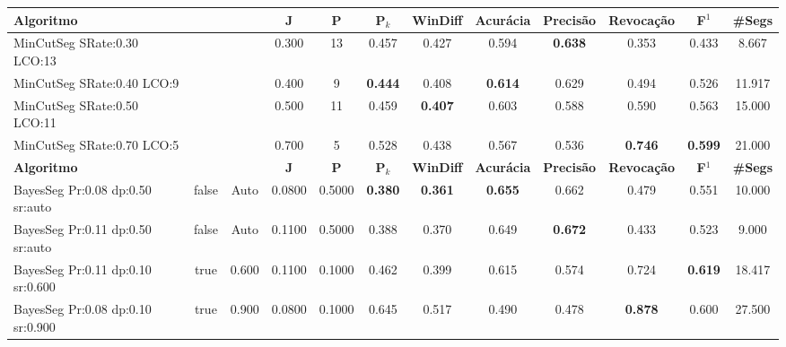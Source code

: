 \documentclass{article}
\begin{document}
\begin{table}[!h]
\begin{tabular}{|l||c|c|c|c|c|c|c|c|c|c|c|}
\hline
		\textbf{Algoritmo} &&& 
		\textbf{J} &
		\textbf{P} & 
		\textbf{P$_k$} & 
		\textbf{WinDiff} & 
		\textbf{Acurácia} & 
		\textbf{Precisão} & 
		\textbf{Revocação} &
		\textbf{F$^1$} &
		\textbf{\#Segs} \\	\hline


 MinCutSeg SRate:0.30 LCO:13 &&& 0.300 & 13 & 0.457 & 0.427 & 0.594 & \cellcolor{gray!20} \textbf{0.638} & 0.353 & 0.433 & 8.667  \\ \hline 

 MinCutSeg SRate:0.40 LCO:9 &&& 0.400 & 9 & \cellcolor{gray!20} \textbf{0.444} & 0.408 & \cellcolor{gray!20} \textbf{0.614} & 0.629 & 0.494 & 0.526 & 11.917  \\ \hline 

 MinCutSeg SRate:0.50 LCO:11 &&& 0.500 & 11 & 0.459 & \cellcolor{gray!20} \textbf{0.407} & 0.603 & 0.588 & 0.590 & 0.563 & 15.000  \\ \hline 

 MinCutSeg SRate:0.70 LCO:5 &&& 0.700 & 5 & 0.528 & 0.438 & 0.567 & 0.536 & \cellcolor{gray!20} \textbf{0.746} & \cellcolor{gray!20} \textbf{0.599} & 21.000  \\ \hline 






\hline
		\textbf{Algoritmo} &&& 
		\textbf{J} &
		\textbf{P} & 
		\textbf{P$_k$} & 
		\textbf{WinDiff} & 
		\textbf{Acurácia} & 
		\textbf{Precisão} & 
		\textbf{Revocação} &
		\textbf{F$^1$} &
		\textbf{\#Segs} \\	\hline




 BayesSeg Pr:0.08 dp:0.50 sr:auto & false & Auto & 0.0800 & 0.5000 & \cellcolor{gray!20} \textbf{0.380} & \cellcolor{gray!20} \textbf{0.361} & \cellcolor{gray!20} \textbf{0.655} & 0.662 & 0.479 & 0.551 & 10.000  \\ \hline 

 BayesSeg Pr:0.11 dp:0.50 sr:auto & false & Auto & 0.1100 & 0.5000 & 0.388 & 0.370 & 0.649 & \cellcolor{gray!20} \textbf{0.672} & 0.433 & 0.523 & 9.000  \\ \hline 

 BayesSeg Pr:0.11 dp:0.10 sr:0.600 & true & 0.600 & 0.1100 & 0.1000 & 0.462 & 0.399 & 0.615 & 0.574 & 0.724 & \cellcolor{gray!20} \textbf{0.619} & 18.417  \\ \hline 



 BayesSeg Pr:0.08 dp:0.10 sr:0.900 & true & 0.900 & 0.0800 & 0.1000 & 0.645 & 0.517 & 0.490 & 0.478 & \cellcolor{gray!20} \textbf{0.878} & 0.600 & 27.500  \\ \hline 






\end{tabular}
\end{table}
\end{document}
